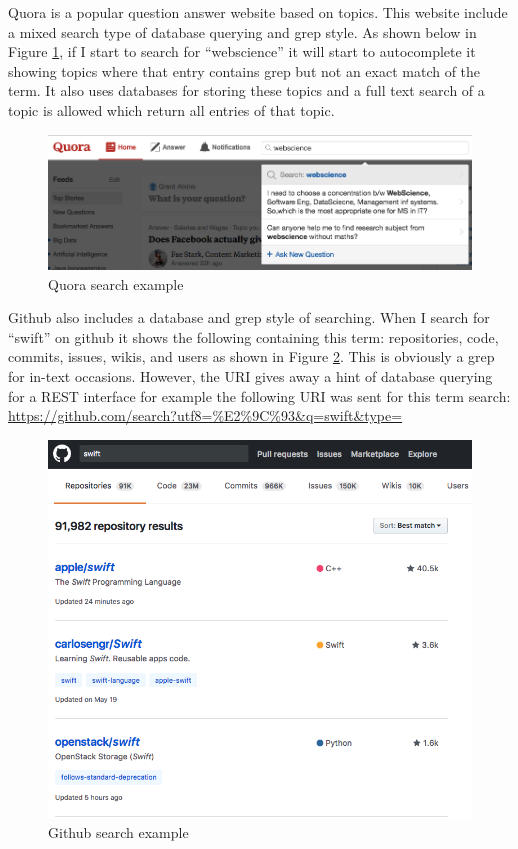 \documentclass[letterpaper,11pt]{article}
\begin{document}
Quora is a popular question answer website based on topics. This website include a mixed search type of database querying and grep style. As shown below in Figure \ref{fig:quora}, if I start to search for ``webscience'' it will start to autocomplete it showing topics where that entry contains grep but not an exact match of the term. It also uses databases for storing these topics and a full text search of a topic is allowed which return all entries of that topic.

\begin{figure}[h]
\centering
\includegraphics[scale=0.35]{quora.png}
\caption{Quora search example}
\label{fig:quora}
\end{figure}

Github also includes a database and grep style of searching. When I search for ``swift'' on github it shows the following containing this term: repositories, code, commits, issues, wikis, and users as shown in Figure \ref{fig:github}. This is obviously a grep for in-text occasions. However, the URI gives away a hint of database querying for a REST interface for example the following URI was sent for this term search: \url{https://github.com/search?utf8=%E2%9C%93&q=swift&type=}

\begin{figure}[h]
\centering
\includegraphics[scale=0.35]{github.png}
\caption{Github search example}
\label{fig:github}
\end{figure}
\end{document}
